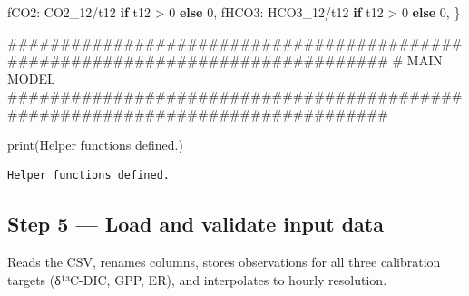 \documentclass[
  letterpaper,
  DIV=11,
  numbers=noendperiod]{scrartcl}
\newenvironment{Shaded}{\begin{snugshade}}{\end{snugshade}}
\newcommand{\BuiltInTok}[1]{\textcolor[rgb]{0.00,0.23,0.31}{#1}}
\newcommand{\CommentTok}[1]{\textcolor[rgb]{0.37,0.37,0.37}{#1}}
\newcommand{\ControlFlowTok}[1]{\textcolor[rgb]{0.00,0.23,0.31}{\textbf{#1}}}
\newcommand{\DecValTok}[1]{\textcolor[rgb]{0.68,0.00,0.00}{#1}}
\newcommand{\NormalTok}[1]{\textcolor[rgb]{0.00,0.23,0.31}{#1}}
\newcommand{\OperatorTok}[1]{\textcolor[rgb]{0.37,0.37,0.37}{#1}}
\newcommand{\StringTok}[1]{\textcolor[rgb]{0.13,0.47,0.30}{#1}}
\begin{document}
\begin{Shaded}
\begin{Highlighting}[]
        \StringTok{\textquotesingle{}fCO2\textquotesingle{}}\NormalTok{:  CO2\_12}\OperatorTok{/}\NormalTok{t12 }\ControlFlowTok{if}\NormalTok{ t12 }\OperatorTok{\textgreater{}} \DecValTok{0} \ControlFlowTok{else} \DecValTok{0}\NormalTok{,}
        \StringTok{\textquotesingle{}fHCO3\textquotesingle{}}\NormalTok{: HCO3\_12}\OperatorTok{/}\NormalTok{t12 }\ControlFlowTok{if}\NormalTok{ t12 }\OperatorTok{\textgreater{}} \DecValTok{0} \ControlFlowTok{else} \DecValTok{0}\NormalTok{,}
\NormalTok{    \}}


\CommentTok{\#\#\#\#\#\#\#\#\#\#\#\#\#\#\#\#\#\#\#\#\#\#\#\#\#\#\#\#\#\#\#\#\#\#\#\#\#\#\#\#\#\#\#\#\#\#\#\#\#\#\#\#\#\#\#\#\#\#\#\#\#\#\#\#\#\#\#\#\#\#\#\#\#\#\#\#\#\#\#}
\CommentTok{\# MAIN MODEL}
\CommentTok{\#\#\#\#\#\#\#\#\#\#\#\#\#\#\#\#\#\#\#\#\#\#\#\#\#\#\#\#\#\#\#\#\#\#\#\#\#\#\#\#\#\#\#\#\#\#\#\#\#\#\#\#\#\#\#\#\#\#\#\#\#\#\#\#\#\#\#\#\#\#\#\#\#\#\#\#\#\#\#}

\BuiltInTok{print}\NormalTok{(}\StringTok{\textquotesingle{}Helper functions defined.\textquotesingle{}}\NormalTok{)}
\end{Highlighting}
\end{Shaded}

\begin{verbatim}
Helper functions defined.
\end{verbatim}

\subsection{Step 5 --- Load and validate input
data}\label{step-5-load-and-validate-input-data}

Reads the CSV, renames columns, stores observations for all three
calibration targets (δ¹³C-DIC, GPP, ER), and interpolates to hourly
resolution.
\end{document}
